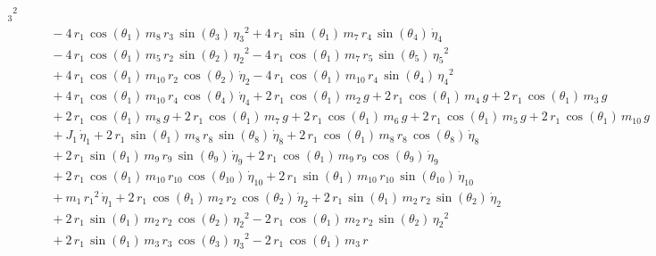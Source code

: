 \begin{eqnarray*}
{{_{3}}}^2 \\ &&\quad\mbox{} - 4\,r_{1}\,\cos({\theta_{1}})\,m_{8}\,r_{3
}\,\sin({\theta_{3}})\,{{\eta_{3}}}^2 + 4\,r_{1}\,\sin({\theta_{1}})\,
m_{7}\,r_{4}\,\sin({\theta_{4}})\,{\dot{\eta}_{4}} \\ &&\quad\mbox{}
 - 4\,r_{1}\,\cos({\theta_{1}})\,m_{5}\,r_{2}\,\sin({\theta_{2}})\,{{
\eta_{2}}}^2 - 4\,r_{1}\,\cos({\theta_{1}})\,m_{7}\,r_{5}\,\sin({
\theta_{5}})\,{{\eta_{5}}}^2 \\ &&\quad\mbox{} + 4\,r_{1}\,\cos({
\theta_{1}})\,m_{10}\,r_{2}\,\cos({\theta_{2}})\,{\dot{\eta}_{2}} - 4
\,r_{1}\,\cos({\theta_{1}})\,m_{10}\,r_{4}\,\sin({\theta_{4}})\,{{\eta
_{4}}}^2 \\ &&\quad\mbox{} + 4\,r_{1}\,\cos({\theta_{1}})\,m_{10}\,r_{
4}\,\cos({\theta_{4}})\,{\dot{\eta}_{4}} + 2\,r_{1}\,\cos({\theta_{1}}
)\,m_{2}\,g + 2\,r_{1}\,\cos({\theta_{1}})\,m_{4}\,g + 2\,r_{1}\,\cos(
{\theta_{1}})\,m_{3}\,g \\ &&\quad\mbox{} + 2\,r_{1}\,\cos({\theta_{1}
})\,m_{8}\,g + 2\,r_{1}\,\cos({\theta_{1}})\,m_{7}\,g + 2\,r_{1}\,\cos
({\theta_{1}})\,m_{6}\,g + 2\,r_{1}\,\cos({\theta_{1}})\,m_{5}\,g + 2
\,r_{1}\,\cos({\theta_{1}})\,m_{10}\,g \\ &&\quad\mbox{} + J_{1}\,{
\dot{\eta}_{1}} + 2\,r_{1}\,\sin({\theta_{1}})\,m_{8}\,r_{8}\,\sin({
\theta_{8}})\,{\dot{\eta}_{8}} + 2\,r_{1}\,\cos({\theta_{1}})\,m_{8}\,
r_{8}\,\cos({\theta_{8}})\,{\dot{\eta}_{8}} \\ &&\quad\mbox{} + 2\,r_{
1}\,\sin({\theta_{1}})\,m_{9}\,r_{9}\,\sin({\theta_{9}})\,{\dot{\eta}
_{9}} + 2\,r_{1}\,\cos({\theta_{1}})\,m_{9}\,r_{9}\,\cos({\theta_{9}})
\,{\dot{\eta}_{9}} \\ &&\quad\mbox{} + 2\,r_{1}\,\cos({\theta_{1}})\,m
_{10}\,r_{10}\,\cos({\theta_{10}})\,{\dot{\eta}_{10}} + 2\,r_{1}\,\sin
({\theta_{1}})\,m_{10}\,r_{10}\,\sin({\theta_{10}})\,{\dot{\eta}_{10}}
 \\ &&\quad\mbox{} + m_{1}\,{r_{1}}^2\,{\dot{\eta}_{1}} + 2\,r_{1}\,
\cos({\theta_{1}})\,m_{2}\,r_{2}\,\cos({\theta_{2}})\,{\dot{\eta}_{2}}
 + 2\,r_{1}\,\sin({\theta_{1}})\,m_{2}\,r_{2}\,\sin({\theta_{2}})\,{
\dot{\eta}_{2}} \\ &&\quad\mbox{} + 2\,r_{1}\,\sin({\theta_{1}})\,m_{2
}\,r_{2}\,\cos({\theta_{2}})\,{{\eta_{2}}}^2 - 2\,r_{1}\,\cos({\theta
_{1}})\,m_{2}\,r_{2}\,\sin({\theta_{2}})\,{{\eta_{2}}}^2
 \\ &&\quad\mbox{} + 2\,r_{1}\,\sin({\theta_{1}})\,m_{3}\,r_{3}\,\cos(
{\theta_{3}})\,{{\eta_{3}}}^2 - 2\,r_{1}\,\cos({\theta_{1}})\,m_{3}\,r

\end{eqnarray*}
